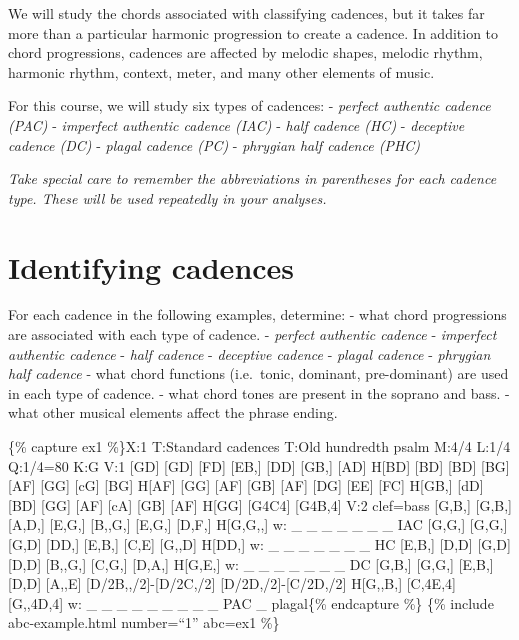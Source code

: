 \documentclass{book}
\begin{document}
We will study the chords associated with classifying cadences, but it takes
far more than a particular harmonic progression to create a cadence. In
addition to chord progressions, cadences are affected by melodic shapes,
melodic rhythm, harmonic rhythm, context, meter, and many other elements of
music.

For this course, we will study six types of cadences: - \emph{perfect
authentic cadence (PAC)} - \emph{imperfect authentic cadence (IAC)} -
\emph{half cadence (HC)} - \emph{deceptive cadence (DC)} - \emph{plagal
cadence (PC)} - \emph{phrygian half cadence (PHC)}

\emph{Take special care to remember the abbreviations in parentheses for each
cadence type. These will be used repeatedly in your analyses.}

\hypertarget{identifying-cadences}{%
\section{Identifying cadences}\label{identifying-cadences}}

For each cadence in the following examples, determine: - what chord
progressions are associated with each type of cadence. - \emph{perfect
authentic cadence} - \emph{imperfect authentic cadence} - \emph{half cadence}
- \emph{deceptive cadence} - \emph{plagal cadence} - \emph{phrygian half
cadence} - what chord functions (i.e.~tonic, dominant, pre-dominant) are used
in each type of cadence. - what chord tones are present in the soprano and
bass. - what other musical elements affect the phrase ending.

\{\% capture ex1 \%\}X:1 T:Standard cadences T:Old hundredth psalm M:4/4 L:1/4
Q:1/4=80 K:G V:1 {[}GD{]}\textbar{} {[}GD{]} {[}FD{]} {[}EB,{]}
{[}DD{]}\textbar{} {[}GB,{]} {[}AD{]} H{[}BD{]} {[}BD{]}\textbar{} {[}BD{]}
{[}BG{]} {[}AF{]} {[}GG{]}\textbar{} {[}cG{]} {[}BG{]} H{[}AF{]}
{[}GG{]}\textbar{} {[}AF{]} {[}GB{]} {[}AF{]} {[}DG{]}\textbar{} {[}EE{]}
{[}FC{]} H{[}GB,{]} {[}dD{]}\textbar{} {[}BD{]} {[}GG{]} {[}AF{]}
{[}cA{]}\textbar{} {[}GB{]} {[}AF{]} H{[}GG{]}\textbar\textbar{}
{[}G4C4{]}\textbar{} {[}G4B,4{]}\textbar{]} V:2 clef=bass {[}G,B,{]}\textbar{}
{[}G,B,{]} {[}A,D,{]} {[}E,G,{]} {[}B,,G,{]}\textbar{} {[}E,G,{]} {[}D,F,{]}
H{[}G,G,,{]} w: \_ \_ \_ \_ \_ \_ \_ IAC {[}G,G,{]}\textbar{} {[}G,G,{]}
{[}G,D{]} {[}DD,{]} {[}E,B,{]}\textbar{} {[}C,E{]} {[}G,,D{]} H{[}DD,{]} w: \_
\_ \_ \_ \_ \_ \_ HC {[}E,B,{]}\textbar{} {[}D,D{]} {[}G,D{]} {[}D,D{]}
{[}B,,G,{]}\textbar{} {[}C,G,{]} {[}D,A,{]} H{[}G,E,{]} w: \_ \_ \_ \_ \_ \_
\_ DC {[}G,B,{]}\textbar{} {[}G,G,{]} {[}E,B,{]} {[}D,D{]}
{[}A,,E{]}\textbar{} {[}D/2B,,/2{]}-{[}D/2C,/2{]} {[}D/2D,/2{]}-{[}C/2D,/2{]}
H{[}G,,B,{]}\textbar\textbar{} {[}C,4E,4{]}\textbar{} {[}G,,4D,4{]}\textbar{]}
w: \_ \_ \_ \_ \_ \_ \_ \_ \_ PAC \_ plagal\{\% endcapture \%\} \{\% include
abc-example.html number=``1'' abc=ex1 \%\}
\end{document}
